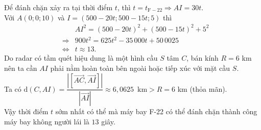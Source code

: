 \begin{bt}
{		Để đánh chặn xảy ra  tại thời điểm $t$, thì $t=t_{\mathrm{F-22}} \Rightarrow AI=30t$.\\
		Với $A(0;0;10)$ và $I=(500-20t;  500-15t; 5)$ thì
		\allowdisplaybreaks 
		\begin{eqnarray*}
			&& AI^2=(500-20t)^2 + (500-15t)^2 +  5^2 \\
			&\Rightarrow& 900t^2=625t^2 -  35\,000t + 50\,0025 \\
			&\Leftrightarrow& t \approx  13.
		\end{eqnarray*}
		Do radar có tầm quét hiệu dung là một hình cầu  $S$ tâm $C$, bán kính $R=6$ km nên
		ta cần $AI$ phải  nằm hoàn toàn bên ngoài hoặc tiếp xúc với mặt cầu $S$.\\
		Ta có $\mathrm{d}(C,AI)=\dfrac{\left|\left[\overrightarrow{AC},\overrightarrow{AI}\right]\right|}{\left|\overrightarrow{AI}\right|}  \approx 6{,}0625\,\text{ km} > R=6$ km (thỏa mãn).\\
		Vậy thời điểm $t$ sớm nhất có thể mà máy bay F-22 có thể đánh chặn  thành công máy bay không người lái là $13$ giây.
	} 
\end{bt}

